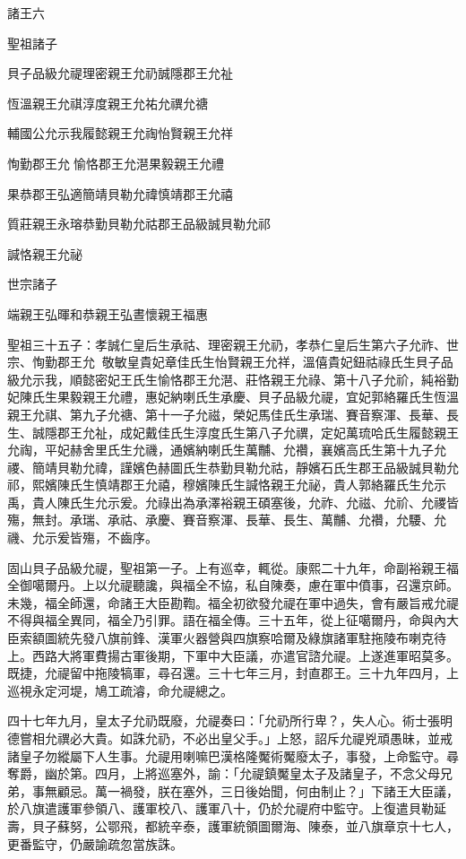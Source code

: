 
\begin{pinyinscope}
諸王六

聖祖諸子

貝子品級允禔理密親王允礽誠隱郡王允祉

恆溫親王允祺淳度親王允祐允禩允禟

輔國公允示我履懿親王允祹怡賢親王允祥

恂勤郡王允愉恪郡王允潖果毅親王允禮

果恭郡王弘適簡靖貝勒允禕慎靖郡王允禧

質莊親王永瑢恭勤貝勒允祜郡王品級誠貝勒允祁

諴恪親王允祕

世宗諸子

端親王弘暉和恭親王弘晝懷親王福惠

聖祖三十五子：孝誠仁皇后生承祜、理密親王允礽，孝恭仁皇后生第六子允祚、世宗、恂勤郡王允，敬敏皇貴妃章佳氏生怡賢親王允祥，溫僖貴妃鈕祜祿氏生貝子品級允示我，順懿密妃王氏生愉恪郡王允潖、莊恪親王允祿、第十八子允祄，純裕勤妃陳氏生果毅親王允禮，惠妃納喇氏生承慶、貝子品級允禔，宜妃郭絡羅氏生恆溫親王允祺、第九子允禟、第十一子允禌，榮妃馬佳氏生承瑞、賽音察渾、長華、長生、誠隱郡王允祉，成妃戴佳氏生淳度氏生第八子允禩，定妃萬琉哈氏生履懿親王允祹，平妃赫舍里氏生允禨，通嬪納喇氏生萬黼、允禶，襄嬪高氏生第十九子允禝、簡靖貝勒允禕，謹嬪色赫圖氏生恭勤貝勒允祜，靜嬪石氏生郡王品級誠貝勒允祁，熙嬪陳氏生慎靖郡王允禧，穆嬪陳氏生諴恪親王允祕，貴人郭絡羅氏生允示禹，貴人陳氏生允示爰。允祿出為承澤裕親王碩塞後，允祚、允禌、允祄、允禝皆殤，無封。承瑞、承祜、承慶、賽音察渾、長華、長生、萬黼、允禶，允騕、允禨、允示爰皆殤，不齒序。

固山貝子品級允禔，聖祖第一子。上有巡幸，輒從。康熙二十九年，命副裕親王福全御噶爾丹。上以允禔聽讒，與福全不協，私自陳奏，慮在軍中僨事，召還京師。未幾，福全師還，命諸王大臣勘鞫。福全初欲發允禔在軍中過失，會有嚴旨戒允禔不得與福全異同，福全乃引罪。語在福全傳。三十五年，從上征噶爾丹，命與內大臣索額圖統先發八旗前鋒、漢軍火器營與四旗察哈爾及綠旗諸軍駐拖陵布喇克待上。西路大將軍費揚古軍後期，下軍中大臣議，亦遣官諮允禔。上遂進軍昭莫多。既捷，允禔留中拖陵犒軍，尋召還。三十七年三月，封直郡王。三十九年四月，上巡視永定河堤，鳩工疏濬，命允禔總之。

四十七年九月，皇太子允礽既廢，允禔奏曰：「允礽所行卑？，失人心。術士張明德嘗相允禩必大貴。如誅允礽，不必出皇父手。」上怒，詔斥允禔兇頑愚昧，並戒諸皇子勿縱屬下人生事。允禔用喇嘛巴漢格隆魘術魘廢太子，事發，上命監守。尋奪爵，幽於第。四月，上將巡塞外，諭：「允禔鎮魘皇太子及諸皇子，不念父母兄弟，事無顧忌。萬一禍發，朕在塞外，三日後始聞，何由制止？」下諸王大臣議，於八旗遣護軍參領八、護軍校八、護軍八十，仍於允禔府中監守。上復遣貝勒延壽，貝子蘇努，公鄂飛，都統辛泰，護軍統領圖爾海、陳泰，並八旗章京十七人，更番監守，仍嚴諭疏忽當族誅。


\end{pinyinscope}
